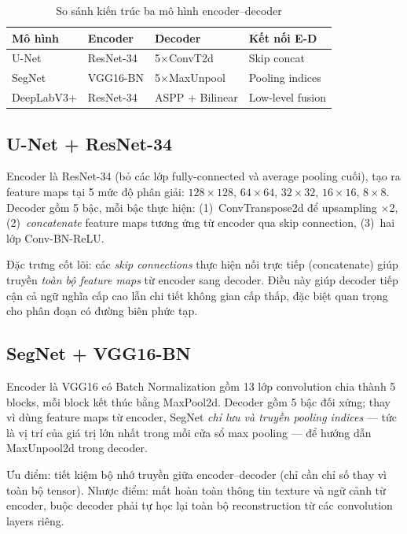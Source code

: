 \documentclass{article}
\begin{document}
\begin{table}[htbp]
\centering
\caption{So sánh kiến trúc ba mô hình encoder--decoder}
\label{tbl:arch}
\footnotesize
\begin{tabular}{l|l|l|l}
\toprule
\textbf{Mô hình} & \textbf{Encoder} & \textbf{Decoder} & \textbf{Kết nối E-D} \\
\midrule
U-Net       & ResNet-34    & 5$\times$ConvT2d  & Skip concat \\
SegNet      & VGG16-BN     & 5$\times$MaxUnpool & Pooling indices \\
DeepLabV3+  & ResNet-34    & ASPP + Bilinear   & Low-level fusion \\
\bottomrule
\end{tabular}
\end{table}



\subsection{U-Net + ResNet-34}
\label{subsec:unet}

Encoder là ResNet-34 (bỏ các lớp fully-connected và average pooling cuối), tạo ra feature maps tại 5 mức độ phân giải: $128{\times}128$, $64{\times}64$, $32{\times}32$, $16{\times}16$, $8{\times}8$.
Decoder gồm 5 bậc, mỗi bậc thực hiện: (1)~ConvTranspose2d để upsampling $\times$2, (2)~\emph{concatenate} feature maps tương ứng từ encoder qua skip connection, (3)~hai lớp Conv-BN-ReLU.

Đặc trưng cốt lõi: các \emph{skip connections} thực hiện nối trực tiếp (concatenate) giúp truyền \emph{toàn bộ feature maps} từ encoder sang decoder.
Điều này giúp decoder tiếp cận cả ngữ nghĩa cấp cao lẫn chi tiết không gian cấp thấp, đặc biệt quan trọng cho phân đoạn có đường biên phức tạp.

\subsection{SegNet + VGG16-BN}
\label{subsec:segnet}

Encoder là VGG16 có Batch Normalization gồm 13 lớp convolution chia thành 5 blocks, mỗi block kết thúc bằng MaxPool2d.
Decoder gồm 5 bậc đối xứng; thay vì dùng feature maps từ encoder, SegNet \emph{chỉ lưu và truyền pooling indices} --- tức là vị trí của giá trị lớn nhất trong mỗi cửa sổ max pooling --- để hướng dẫn MaxUnpool2d trong decoder.

Ưu điểm: tiết kiệm bộ nhớ truyền giữa encoder--decoder (chỉ cần chỉ số thay vì toàn bộ tensor).
Nhược điểm: mất hoàn toàn thông tin texture và ngữ cảnh từ encoder, buộc decoder phải tự học lại toàn bộ reconstruction từ các convolution layers riêng.
\end{document}
